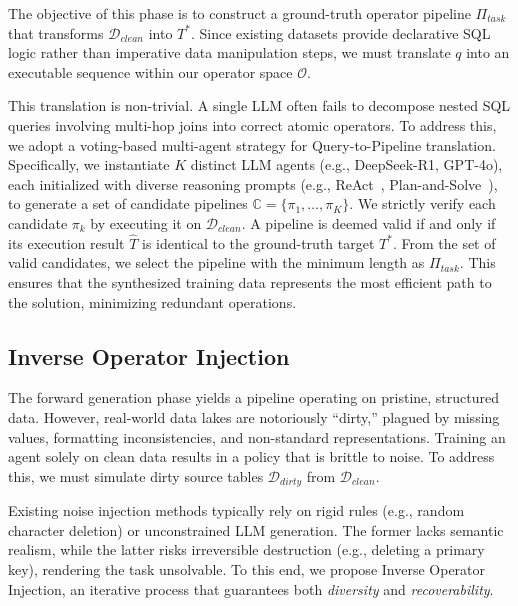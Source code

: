 The objective of this phase is to construct a ground-truth operator pipeline $\Pi_{task}$ that transforms $\mathcal{D}_{clean}$ into $T^*$. Since existing datasets provide declarative SQL logic rather than imperative data manipulation steps, we must translate $q$ into an executable sequence within our operator space $\mathcal{O}$.

This translation is non-trivial. A single LLM often fails to decompose nested SQL queries involving multi-hop joins into correct atomic operators. To address this, we adopt a {voting-based multi-agent strategy} for Query-to-Pipeline translation.
Specifically, we instantiate $K$ distinct LLM agents (e.g., DeepSeek-R1, GPT-4o), each initialized with diverse reasoning prompts (e.g., ReAct~\cite{aksitov2023rest}, Plan-and-Solve~\cite{wang2024chain}), to generate a set of candidate pipelines $\mathbb{C} = \{\pi_1, \dots, \pi_K\}$.
We strictly verify each candidate $\pi_k$ by executing it on $\mathcal{D}_{clean}$. A pipeline is deemed valid if and only if its execution result $\hat{T}$ is identical to the ground-truth target $T^*$.
From the set of valid candidates, we select the pipeline with the minimum length as $\Pi_{task}$. This ensures that the synthesized training data represents the most efficient path to the solution, minimizing redundant operations.

\subsection{Inverse Operator Injection}
\label{subsec:backward_synthesis}

The forward generation phase yields a pipeline operating on pristine, structured data. However, real-world data lakes are notoriously ``dirty,'' plagued by missing values, formatting inconsistencies, and non-standard representations. Training an agent solely on clean data results in a policy that is brittle to noise.
To address this, we must simulate dirty source tables $\mathcal{D}_{dirty}$ from $\mathcal{D}_{clean}$.

Existing noise injection methods typically rely on rigid rules (e.g., random character deletion) or unconstrained LLM generation. The former lacks semantic realism, while the latter risks irreversible destruction (e.g., deleting a primary key), rendering the task unsolvable.
To this end, we propose {Inverse Operator Injection}, an iterative process that guarantees both \textit{diversity} and \textit{recoverability}.

